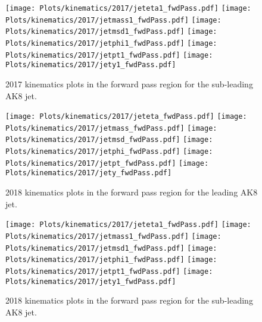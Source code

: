 \begin{figure}[htp]
	\begin{center}

		\texttt{[image: Plots/kinematics/2017/jeteta1\_fwdPass.pdf]}
		\texttt{[image: Plots/kinematics/2017/jetmass1\_fwdPass.pdf]}
		\texttt{[image: Plots/kinematics/2017/jetmsd1\_fwdPass.pdf]}
		\texttt{[image: Plots/kinematics/2017/jetphi1\_fwdPass.pdf]}
		\texttt{[image: Plots/kinematics/2017/jetpt1\_fwdPass.pdf]}
		\texttt{[image: Plots/kinematics/2017/jety1\_fwdPass.pdf]}

		\caption{2017 kinematics plots in the forward pass region for the sub-leading AK8 jet.}
		\label{fig:kin2017_fwdPass1}
	\end{center}
\end{figure}



\begin{figure}[htp]
	\begin{center}
		
		\texttt{[image: Plots/kinematics/2017/jeteta\_fwdPass.pdf]}
		\texttt{[image: Plots/kinematics/2017/jetmass\_fwdPass.pdf]}
		\texttt{[image: Plots/kinematics/2017/jetmsd\_fwdPass.pdf]}
		\texttt{[image: Plots/kinematics/2017/jetphi\_fwdPass.pdf]}
		\texttt{[image: Plots/kinematics/2017/jetpt\_fwdPass.pdf]}
		\texttt{[image: Plots/kinematics/2017/jety\_fwdPass.pdf]}
		
		\caption{2018 kinematics plots in the forward pass region for the leading AK8 jet.}
		\label{fig:kin2018_fwdPass}
	\end{center}
\end{figure}



\begin{figure}[htp]
	\begin{center}

		\texttt{[image: Plots/kinematics/2017/jeteta1\_fwdPass.pdf]}
		\texttt{[image: Plots/kinematics/2017/jetmass1\_fwdPass.pdf]}
		\texttt{[image: Plots/kinematics/2017/jetmsd1\_fwdPass.pdf]}
		\texttt{[image: Plots/kinematics/2017/jetphi1\_fwdPass.pdf]}
		\texttt{[image: Plots/kinematics/2017/jetpt1\_fwdPass.pdf]}
		\texttt{[image: Plots/kinematics/2017/jety1\_fwdPass.pdf]}

		\caption{2018 kinematics plots in the forward pass region for the sub-leading AK8 jet.}
		\label{fig:kin2018_fwdPass1}
	\end{center}
\end{figure}



